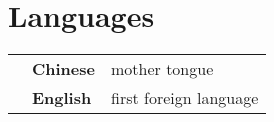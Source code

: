 \section*{Languages}

\begin{tabular}{p{} p{} p{}}
 & \textbf{Chinese} & mother tongue\\
 & \textbf{English} & first foreign language\\  
\end{tabular}
